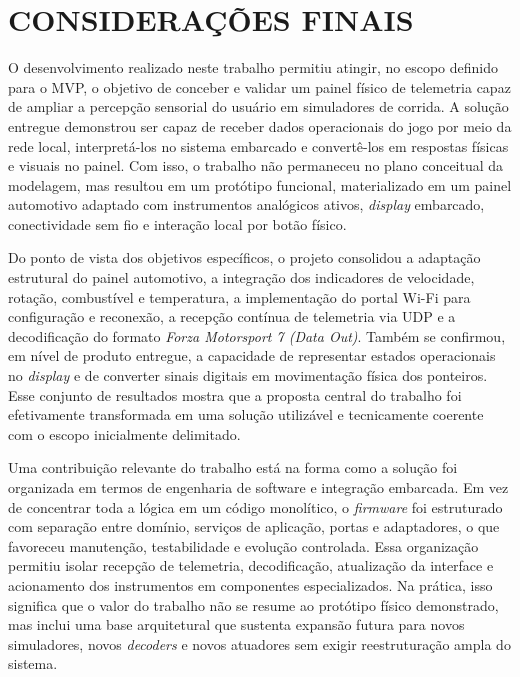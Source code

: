 \documentclass[
  12pt,
  oneside,
  a4paper,
  chapter=TITLE,
  section=TITLE,
  subsection=TITLE,
  brazil
]{abntex2}
\newcommand{\estrangeirismo}[1]{\textit{#1}}
\begin{document}
\chapter{CONSIDERAÇÕES FINAIS}

O desenvolvimento realizado neste trabalho permitiu atingir, no escopo definido para o MVP, o objetivo de conceber e validar um painel físico de telemetria capaz de ampliar a percepção sensorial do usuário em simuladores de corrida. A solução entregue demonstrou ser capaz de receber dados operacionais do jogo por meio da rede local, interpretá-los no sistema embarcado e convertê-los em respostas físicas e visuais no painel. Com isso, o trabalho não permaneceu no plano conceitual da modelagem, mas resultou em um protótipo funcional, materializado em um painel automotivo adaptado com instrumentos analógicos ativos, \estrangeirismo{display} embarcado, conectividade sem fio e interação local por botão físico.

Do ponto de vista dos objetivos específicos, o projeto consolidou a adaptação estrutural do painel automotivo, a integração dos indicadores de velocidade, rotação, combustível e temperatura, a implementação do portal Wi-Fi para configuração e reconexão, a recepção contínua de telemetria via UDP e a decodificação do formato \estrangeirismo{Forza Motorsport 7 (Data Out)}. Também se confirmou, em nível de produto entregue, a capacidade de representar estados operacionais no \estrangeirismo{display} e de converter sinais digitais em movimentação física dos ponteiros. Esse conjunto de resultados mostra que a proposta central do trabalho foi efetivamente transformada em uma solução utilizável e tecnicamente coerente com o escopo inicialmente delimitado.

Uma contribuição relevante do trabalho está na forma como a solução foi organizada em termos de engenharia de software e integração embarcada. Em vez de concentrar toda a lógica em um código monolítico, o \estrangeirismo{firmware} foi estruturado com separação entre domínio, serviços de aplicação, portas e adaptadores, o que favoreceu manutenção, testabilidade e evolução controlada. Essa organização permitiu isolar recepção de telemetria, decodificação, atualização da interface e acionamento dos instrumentos em componentes especializados. Na prática, isso significa que o valor do trabalho não se resume ao protótipo físico demonstrado, mas inclui uma base arquitetural que sustenta expansão futura para novos simuladores, novos \estrangeirismo{decoders} e novos atuadores sem exigir reestruturação ampla do sistema.
\end{document}
